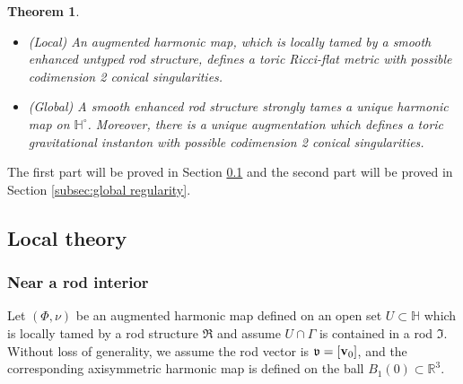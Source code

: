 \documentclass[a4paper,11pt]{amsart}
\newtheorem{theorem}{Theorem}[section]
\theoremstyle{definition}
\numberwithin{equation}{section}
\newcommand{\dH}{\mathbb{H}}
\newcommand{\R}{\mathbb{R}}
\newcommand{\mI} {\mathfrak I}
\newcommand{\mR} {\mathfrak R}
\DeclareMathOperator{\bv}{{\bf v}}
\begin{document}
\begin{theorem}\label{t:from tame harmonic to conical metric}
\ 
   \begin{itemize}
       \item (Local) An augmented harmonic map, which is  locally tamed by a smooth enhanced untyped rod structure, defines a toric Ricci-flat metric with possible codimension 2 conical singularities. 
       \item (Global) A smooth enhanced rod structure strongly tames a unique harmonic map on $\dH^\circ$. Moreover, there is a unique augmentation which defines a toric gravitational instanton with possible codimension 2 conical singularities. 
   \end{itemize} 
\end{theorem}

The first part will be proved in Section \ref{subsec:local regularity} and the second part will be proved in Section \ref{subsec:global regularity}.


\subsection{Local theory}\label{subsec:local regularity}


\subsubsection{Near a rod interior}
\label{subsubsec:local regularity near rods}
Let $(\Phi, \nu)$ be an augmented harmonic map defined on an open set $U\subset \dH$ which is locally tamed by  a rod structure $\mR$ and assume $U\cap\Gamma$ is contained in a rod $\mI$. Without loss of generality, we assume the rod vector is $\mathfrak{v}=[\bv_0]$, and the corresponding axisymmetric harmonic map   is defined on the ball $B_{1}(0)\subset \R^3$.
\end{document}
